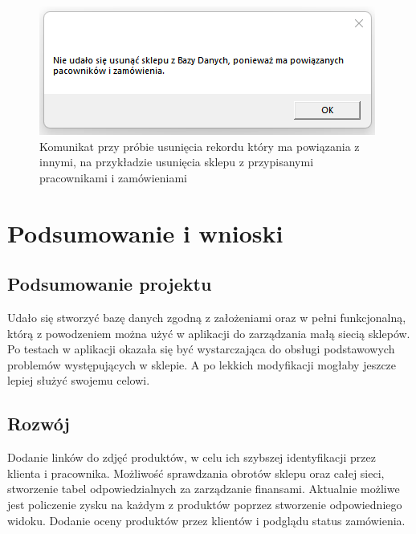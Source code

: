 \documentclass[12pt,a4paper]{article}
\begin{document}
            \begin{figure}[H]
                \centering
                \includegraphics{images/komunikat2.png}
                \caption{Komunikat przy próbie usunięcia rekordu który ma powiązania z innymi, na przykładzie usunięcia sklepu z przypisanymi pracownikami i zamówieniami}
            \end{figure}
            
    \section{Podsumowanie i wnioski}
        \subsection{Podsumowanie projektu}
            Udało się stworzyć bazę danych zgodną z założeniami oraz w pełni funkcjonalną, którą z powodzeniem można użyć w aplikacji do zarządzania małą siecią sklepów. Po testach w aplikacji okazała się być wystarczająca do obsługi podstawowych problemów występujących w sklepie. A po lekkich modyfikacji mogłaby jeszcze lepiej służyć swojemu celowi.
            
        \subsection{Rozwój}
            Dodanie linków do zdjęć produktów, w celu ich szybszej identyfikacji przez klienta i pracownika. Możliwość sprawdzania obrotów sklepu oraz całej sieci, stworzenie tabel odpowiedzialnych za zarządzanie finansami. Aktualnie możliwe jest policzenie zysku na każdym z produktów poprzez stworzenie odpowiedniego widoku. Dodanie oceny produktów przez klientów i podglądu status zamówienia. 
    
\end{document}
